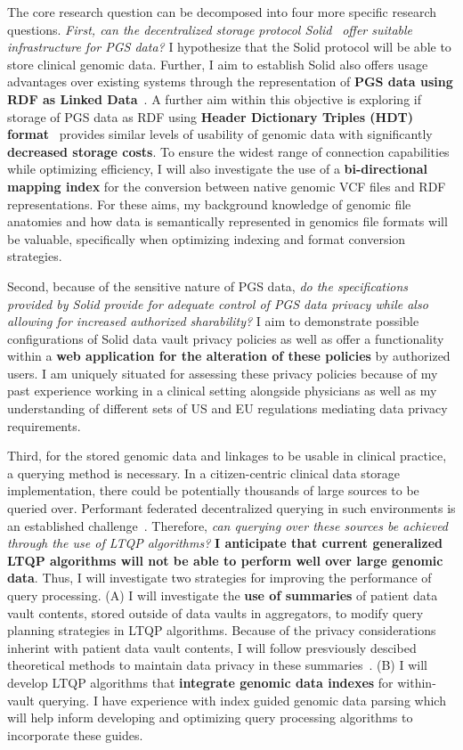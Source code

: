 \documentclass[a4paper,11pt]{article}
\begin{document}
\begin{refsection}
The core research question can be decomposed into four more specific research questions.
\textit{First, can the decentralized storage protocol Solid}~\cite{solid} \textit{offer suitable infrastructure for PGS data?} 
I hypothesize that the Solid protocol will be able to store clinical genomic data.
Further, I aim to establish Solid also offers usage advantages over existing systems through the representation of \textbf{PGS data using RDF as Linked Data}~\cite{berners-lee_linked_2009}.
A further aim within this objective is exploring if storage of PGS data as RDF using \textbf{Header Dictionary Triples (HDT) format}~\cite{hdt} provides similar levels of usability of genomic data with significantly \textbf{decreased storage costs}.
To ensure the widest range of connection capabilities while optimizing efficiency, I will also investigate the use of a \textbf{bi-directional mapping index} for the conversion between native genomic VCF files and RDF representations.
For these aims, my background knowledge of genomic file anatomies and how data is semantically represented in genomics file formats will be valuable, specifically when optimizing indexing and format conversion strategies.

Second, because of the sensitive nature of PGS data, \textit{do the specifications provided by Solid provide for adequate control of PGS data privacy while also allowing for increased authorized sharability?}
I aim to demonstrate possible configurations of Solid data vault privacy policies as well as offer a functionality within a \textbf{web application for the alteration of these policies} by authorized users.
I am uniquely situated for assessing these privacy policies because of my past experience working in a clinical setting alongside physicians as well as my understanding of different sets of US and EU regulations mediating data privacy requirements.

Third, for the stored genomic data and linkages to be usable in clinical practice, a querying method is necessary.
In a citizen-centric clinical data storage implementation, there could be potentially thousands of large sources to be queried over.
Performant federated decentralized querying in such environments is an established challenge~\cite{dang_fedshop_2023}.
Therefore, \textit{can querying over these sources be achieved through the use of LTQP algorithms?}
\textbf{I anticipate that current generalized LTQP algorithms will not be able to perform well over large genomic data}.
Thus, I will investigate two strategies for improving the performance of query processing.
(A) I will investigate the \textbf{use of summaries} of patient data vault contents, stored outside of data vaults in aggregators, to modify query planning strategies in LTQP algorithms.
Because of the privacy considerations inherint with patient data vault contents, I will follow presviously descibed theoretical methods to maintain data privacy in these summaries~\cite{taelman_privacyAgg_2020}.
(B) I will develop LTQP algorithms that \textbf{integrate genomic data indexes} for within-vault querying.
I have experience with index guided genomic data parsing which will help inform developing and optimizing query processing algorithms to incorporate these guides. 


\end{refsection}
\end{document}

